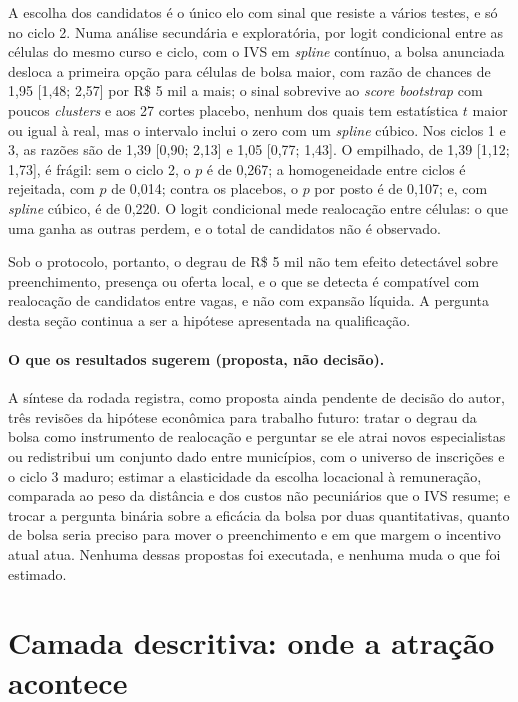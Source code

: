 \documentclass[11pt,a4paper]{article}
\begin{document}
A escolha dos candidatos é o único elo com sinal que resiste a vários testes, e
só no ciclo 2. Numa análise secundária e exploratória, por logit condicional
\citep{mcfadden1974} entre as células do mesmo curso e ciclo, com o IVS em
\emph{spline} contínuo, a bolsa anunciada desloca a primeira opção para
células de bolsa maior, com razão de chances de 1,95 [1,48; 2,57] por R\$ 5 mil
a mais; o sinal sobrevive ao \emph{score bootstrap} com poucos \emph{clusters}
\citep{kline2012} e aos 27 cortes placebo, nenhum dos quais tem estatística $t$
maior ou igual à real, mas o intervalo inclui o zero com um \emph{spline}
cúbico. Nos ciclos 1 e 3, as razões são de 1,39 [0,90; 2,13] e 1,05
[0,77; 1,43]. O empilhado, de 1,39 [1,12; 1,73], é frágil: sem o ciclo 2, o
$p$ é de 0,267; a homogeneidade entre ciclos é rejeitada, com $p$ de 0,014;
contra os placebos, o $p$ por posto é de 0,107; e, com \emph{spline} cúbico, é
de 0,220. O logit condicional mede realocação entre células: o que uma ganha as
outras perdem, e o total de candidatos não é observado.

Sob o protocolo, portanto, o degrau de R\$ 5 mil não tem efeito detectável
sobre preenchimento, presença ou oferta local, e o que se detecta é compatível
com realocação de candidatos entre vagas, e não com expansão líquida. A
pergunta desta seção continua a ser a hipótese apresentada na qualificação.

\paragraph{O que os resultados sugerem (proposta, não decisão).} A síntese da
rodada registra, como proposta ainda pendente de decisão do autor, três
revisões da hipótese econômica para trabalho futuro: tratar o degrau da bolsa
como instrumento de realocação e perguntar se ele atrai novos especialistas ou
redistribui um conjunto dado entre municípios, com o universo de inscrições e o
ciclo 3 maduro; estimar a elasticidade da escolha locacional à remuneração,
comparada ao peso da distância e dos custos não pecuniários que o IVS resume; e
trocar a pergunta binária sobre a eficácia da bolsa por duas quantitativas,
quanto de bolsa seria preciso para mover o preenchimento e em que margem o
incentivo atual atua. Nenhuma dessas propostas foi executada, e nenhuma muda o
que foi estimado.

\section{Camada descritiva: onde a atração acontece}
\label{sec:territorio}
\end{document}
